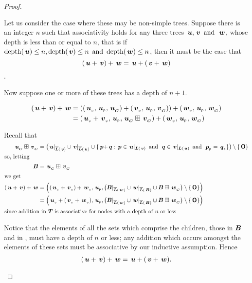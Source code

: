 \begin{proposition}
\begin{proof}
\begin{description}
      Let us consider the case where these may be non-simple
      trees. Suppose there is an integer \(n\) such that associativity
      holds for any three trees \(\node{u}, \node{v} \mand \node{w}\),
      whose depth is less than or equal to \(n\), that is if
      \(\depth(\node{u}) \leq n, \depth(\node{v}) \leq n \mand
      \depth(\node{w}) \leq n\),
      then it must be the case that \[(\node{u} + \node{v}) + \node{w} = \node{u} + (\node{v} + \node{w})\].

      Now suppose one or more of these trees has a depth of
      \(n+1\).
      

      \begin{align*}
          (\node{u}+\node{v})+\node{w} &= (\Node{\nv{u}}{\nlabel{u}}{\child{u}} + \Node{\nv{v}}{\nlabel{u}}{\child{v}}) + \Node{\nv{w}}{\nlabel{u}}{\child{w}} \\
          &= \Node{\nv{u} + \nv{v}}{\nlabel{u}}{\child{u}\stplus\child{v}} + \Node{\nv{w}}{\nlabel{u}}{\child{w}}
      \end{align*}

      Recall that 
      \begin{align*}
          \child{u}\stplus\child{v} &= \childO{u}{v}{p}{q}{+}\\
          \intertext{so, letting}
          \set{B} &= \child{u}\stplus\child{v} \\
          \intertext{we get}
          (\node{u}+\node{v})+\node{w} &=\NNNode{(\nv{u} + \nv{v}) + \nv{w}}{\nlabel{u}}{\bigl(\nsrestrictedto{B}{w}\cup\nrestrictedto{w}{B} \cup \set{B}\stplus\child{w}\bigr)\setminus\{\zerotree\}} \\
          &=\NNNode{\nv{u} + (\nv{v} + \nv{w})}{\nlabel{u}}{\bigl(\nsrestrictedto{B}{w}\cup\nrestrictedto{w}{B}\cup \set{B}\stplus\child{w}\bigr)\setminus\{\zerotree\}} \\
          \intertext{since addition in $\DOM$ is associative for nodes
          with a depth of $n$ or less}
      \end{align*}

      Notice that the elements of all the sets which comprise the children, those in \(\set{B}\) and in ,
      must have a depth of \(n\) or less; any addition which occurs amongst the elements of these sets must be
      associative by our inductive assumption. Hence
      \begin{align*}
          (\node{u}+\node{v})+\node{w} = \node{u}+(\node{v}+\node{w}).
      \end{align*}



\end{description}
\end{proof}
\end{proposition}
